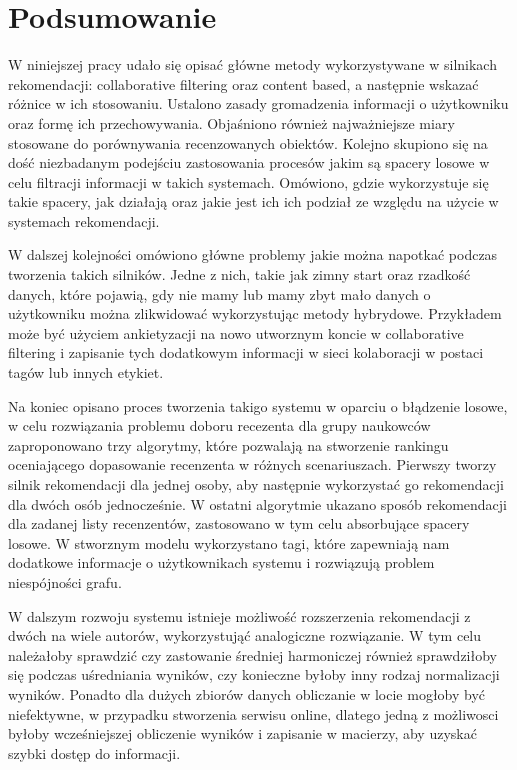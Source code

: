\chapter{Podsumowanie}
\thispagestyle{chapterBeginStyle}



W niniejszej pracy udało się opisać główne metody wykorzystywane w silnikach rekomendacji: collaborative filtering oraz content based, a następnie wskazać różnice w ich stosowaniu. Ustalono zasady gromadzenia informacji o użytkowniku oraz formę ich przechowywania. Objaśniono również najważniejsze miary stosowane do porównywania recenzowanych obiektów. Kolejno skupiono się na dość niezbadanym podejściu zastosowania procesów jakim są spacery losowe w celu filtracji informacji w takich systemach. Omówiono, gdzie wykorzystuje się takie spacery, jak działają oraz jakie jest ich ich podział ze względu na użycie w systemach rekomendacji.

W dalszej kolejności omówiono główne problemy jakie można napotkać podczas tworzenia takich silników. Jedne z nich, takie jak zimny start oraz rzadkość danych, które pojawią, gdy nie mamy lub mamy zbyt mało danych o użytkowniku można zlikwidować wykorzystując metody hybrydowe. Przykładem może być użyciem ankietyzacji na nowo utworznym koncie w collaborative filtering i zapisanie tych dodatkowym informacji w sieci kolaboracji w postaci tagów lub innych etykiet.

Na koniec opisano proces tworzenia takigo systemu w oparciu o błądzenie losowe, w celu rozwiązania problemu doboru recezenta dla grupy naukowców zaproponowano trzy algorytmy, które pozwalają na stworzenie rankingu oceniającego dopasowanie recenzenta w różnych scenariuszach. Pierwszy tworzy silnik rekomendacji dla jednej osoby, aby następnie wykorzystać go rekomendacji dla dwóch osób jednocześnie. W ostatni algorytmie ukazano sposób rekomendacji dla zadanej listy recenzentów, zastosowano w tym celu absorbujące spacery losowe. W stworznym modelu wykorzystano tagi, które zapewniają nam dodatkowe informacje o użytkownikach systemu i rozwiązują problem niespójności grafu.

W dalszym rozwoju systemu istnieje możliwość rozszerzenia rekomendacji z dwóch na wiele autorów, wykorzystująć analogiczne rozwiązanie. W tym celu należałoby sprawdzić czy zastowanie średniej harmoniczej również sprawdziłoby się podczas uśredniania wyników, czy konieczne byłoby inny rodzaj normalizacji wyników. Ponadto dla dużych zbiorów danych obliczanie w locie mogłoby być niefektywne, w przypadku stworzenia serwisu online, dlatego jedną z możliwosci byłoby wcześniejszej obliczenie wyników i zapisanie w macierzy, aby uzyskać szybki dostęp do informacji.